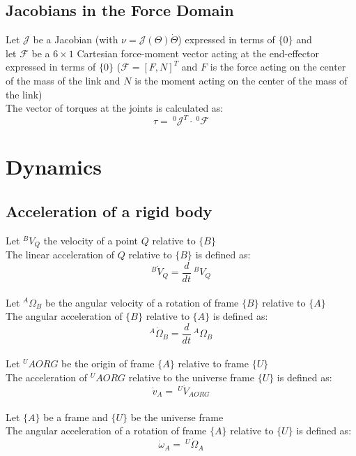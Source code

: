 \documentclass[10pt,a4paper]{article}
\begin{document}
\subsection{Jacobians in the Force Domain}
Let $\mathcal{J}$ be a Jacobian (with $\nu  = \mathcal{J}(\Theta)\dot \Theta$) expressed in terms of $\{0\}$ and \\
let $\mathcal{F}$ be a $6 \times 1$ Cartesian force-moment vector acting at the end-effector expressed in terms of $\{0\}$ ($\mathcal{F} = [F, N]^T$ and $F$ is the force acting on the center of the mass of the link and $N$ is the moment acting on the center of the mass of the link)\\
The vector of torques at the joints is calculated as:
$$
\tau = ~^0\mathcal{J}^T ⋅ ~^0\mathcal{F}
$$

\section{Dynamics}
\subsection{Acceleration of a rigid body}
Let $^BV_Q$ the velocity of a point $Q$ relative to $\{B\}$ \\
The linear acceleration of $Q$ relative to $\{B\}$ is defined as:
$$
^B\dot V_Q = \frac d {dt} ~^BV_Q
$$
\\

Let $^A\Omega_B$ be the angular velocity of a rotation of frame $\{B\}$ relative to $\{A\}$ \\
The angular acceleration of $\{B\}$ relative to $\{A\}$ is defined as:
$$
^A\dot \Omega_B = \frac d {dt} ~^A\Omega_B
$$
\\

Let $^UAORG$ be the origin of frame $\{A\}$ relative to frame $\{U\}$ \\
The acceleration of $^UAORG$ relative to the universe frame $\{U\}$ is defined as:
$$
\dot v_A = ~^U\dot V_{AORG}
$$
\\

Let $\{A\}$ be a frame and $\{U\}$ be the universe frame \\
The angular acceleration of a rotation of frame $\{A\}$ relative to $\{U\}$ is defined as:
$$
\dot \omega_A = ~^U \dot \Omega_{A}
$$
\end{document}
